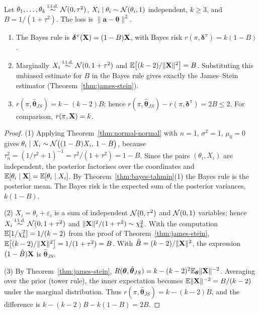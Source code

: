 \documentclass[main.tex]{subfiles}
\begin{document}
\begin{theorem}\label{thm:js-ampirik-bayes}
Let $\theta_1,\dots,\theta_k\overset{\text{i.i.d.}}{\sim}\mathcal{N}(0,\tau^2)$, $X_i\mid\theta_i\sim\mathcal{N}(\theta_i,1)$ independent, $k\ge3$, and $B=1/(1+\tau^2)$. The loss is $\|\mathbf a-\bm\theta\|^2$.
\begin{enumerate}
  \item The Bayes rule is $\bm\delta^\pi(\mathbf{X})=(1-B)\mathbf{X}$, with Bayes risk $r(\pi,\bm\delta^\pi)=k(1-B)$.
  \item Marginally $X_i\overset{\text{i.i.d.}}{\sim}\mathcal{N}(0,1+\tau^2)$ and $\mathbb{E}\big[(k-2)/\|\mathbf{X}\|^2\big]=B$. Substituting this unbiased estimate for $B$ in the Bayes rule gives exactly the James--Stein estimator (Theorem~\ref{thm:james-stein}).
  \item $r(\pi,\hat{\bm\theta}_{JS})=k-(k-2)B$; hence $r(\pi,\hat{\bm\theta}_{JS})-r(\pi,\bm\delta^\pi)=2B\le2$. For comparison, $r(\pi,\mathbf{X})=k$.
\end{enumerate}
\end{theorem}
\begin{proof}
(1) Applying Theorem~\ref{thm:normal-normal} with $n=1$, $\sigma^2=1$, $\mu_0=0$ gives $\theta_i\mid X_i\sim\mathcal{N}\big((1-B)X_i,\,1-B\big)$, because $\tau_n^2=(1/\tau^2+1)^{-1}=\tau^2/(1+\tau^2)=1-B$. Since the pairs $(\theta_i,X_i)$ are independent, the posterior factorises over the coordinates and $\mathbb{E}[\theta_i\mid\mathbf{X}]=\mathbb{E}[\theta_i\mid X_i]$. By Theorem~\ref{thm:bayes-tahmin}(1) the Bayes rule is the posterior mean. The Bayes risk is the expected sum of the posterior variances, $k(1-B)$.

(2) $X_i=\theta_i+\varepsilon_i$ is a sum of independent $\mathcal{N}(0,\tau^2)$ and $\mathcal{N}(0,1)$ variables; hence $X_i\overset{\text{i.i.d.}}{\sim}\mathcal{N}(0,1+\tau^2)$ and $\|\mathbf{X}\|^2/(1+\tau^2)\sim\chi^2_k$. With the computation $\mathbb{E}[1/\chi^2_k]=1/(k-2)$ from the proof of Theorem~\ref{thm:james-stein}, $\mathbb{E}\big[(k-2)/\|\mathbf{X}\|^2\big]=1/(1+\tau^2)=B$. With $\hat B=(k-2)/\|\mathbf{X}\|^2$, the expression $(1-\hat B)\mathbf{X}$ is $\hat{\bm\theta}_{JS}$.

(3) By Theorem~\ref{thm:james-stein}, $R(\bm\theta,\hat{\bm\theta}_{JS})=k-(k-2)^2\mathbb{E}_{\bm\theta}\|\mathbf{X}\|^{-2}$. Averaging over the prior (tower rule), the inner expectation becomes $\mathbb{E}\|\mathbf{X}\|^{-2}=B/(k-2)$ under the marginal distribution. Thus $r(\pi,\hat{\bm\theta}_{JS})=k-(k-2)B$, and the difference is $k-(k-2)B-k(1-B)=2B$.
\end{proof}
\end{document}
